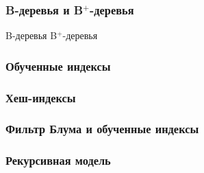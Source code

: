 \documentclass{bmstu-pr}
\begin{document}
\begin{frame}
    \frametitle{B-деревья и B$^+$-деревья}

    \centering B-деревья
    \centering B$^+$-деревья
\end{frame}

\begin{frame}
    \frametitle{Обученные индексы}
    \centering{}
\end{frame}

\begin{frame}
    \frametitle{Хеш-индексы}
    \centering{}
\end{frame}

\begin{frame}
    \frametitle{Фильтр Блума и обученные индексы}
\end{frame}

\begin{frame}
    \frametitle{Рекурсивная модель}
    \centering{}
\end{frame}
\end{document}
